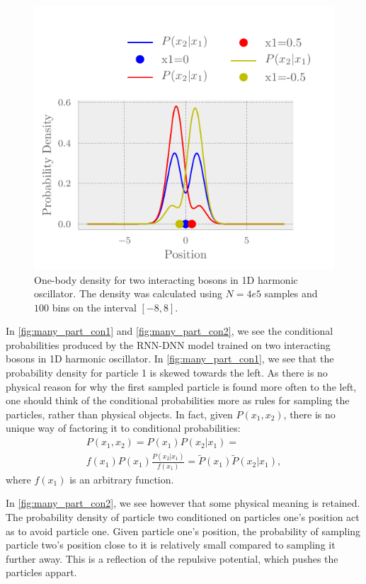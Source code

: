 \begin{figure}[H]
	\includegraphics[]{figures/many_part_con2.pdf}
	\caption{One-body density for two interacting bosons in 1D harmonic oscillator. The density was calculated using $N=4e5$ samples and $100$ bins on the interval $[-8,8]$.}
	\label{fig:many_part_con2}
\end{figure}

In \autoref{fig:many_part_con1} and \autoref{fig:many_part_con2}, we see the conditional probabilities produced by the RNN-DNN model trained on two interacting bosons in 1D harmonic oscillator. In \autoref{fig:many_part_con1}, we see that the probability density for particle 1 is skewed towards the left. As there is no physical reason for why the first sampled particle is found more often to the left, one should think of the conditional probabilities more as rules for sampling the particles, rather than physical objects. In fact, given $P(x_1, x_2)$, there is no unique way of factoring it to conditional probabilities: 
\begin{align*}
	P(x_1, x_2) = P(x_1)P(x_2|x_1) =\\
	f(x_1)P(x_1)\frac{P(x_2|x_1)}{f(x_1)} = \tilde{P}(x_1)\tilde{P}(x_2|x_1),
\end{align*}
where $f(x_1)$ is an arbitrary function.

In \autoref{fig:many_part_con2}, we see however that some physical meaning is retained. The probability density of particle two conditioned on particles one's position act as to avoid particle one. Given particle one's position, the probability of sampling particle two's position close to it is relatively small compared to sampling it further away. This is a reflection of the repulsive potential, which pushes the particles appart.
 
